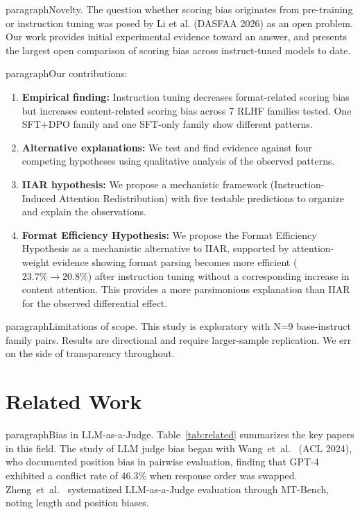 \documentclass[11pt,twocolumn]{article}
\begin{document}
paragraph{Novelty.} The question  whether scoring bias originates from pre-training or instruction tuning  was posed by Li et al. (DASFAA 2026) as an open problem. Our work provides initial experimental evidence toward an answer, and presents the largest open comparison of scoring bias across instruct-tuned models to date.

paragraph{Our contributions:}
\begin{enumerate}
    \item \textbf{Empirical finding:} Instruction tuning decreases format-related scoring bias but increases content-related scoring bias across 7 RLHF families tested. One SFT+DPO family and one SFT-only family show different patterns.
    \item \textbf{Alternative explanations:} We test and find evidence against four competing hypotheses using qualitative analysis of the observed patterns.
    \item \textbf{IIAR hypothesis:} We propose a mechanistic framework (Instruction-Induced Attention Redistribution) with five testable predictions to organize and explain the observations.
    \item \textbf{Format Efficiency Hypothesis:} We propose the Format Efficiency Hypothesis as a mechanistic alternative to IIAR, supported by attention-weight evidence showing format parsing becomes more efficient ($23.7\% \to 20.8\%$) after instruction tuning without a corresponding increase in content attention. This provides a more parsimonious explanation than IIAR for the observed differential effect.
\end{enumerate}

paragraph{Limitations of scope.} This study is exploratory with N=9 base-instruct family pairs. Results are directional and require larger-sample replication. We err on the side of transparency throughout.

\section{Related Work}

paragraph{Bias in LLM-as-a-Judge.}
Table~\ref{tab:related} summarizes the key papers in this field. The study of LLM judge bias began with Wang~et~al.~\cite{wang2023large} (ACL 2024), who documented position bias in pairwise evaluation, finding that GPT-4 exhibited a conflict rate of 46.3\% when response order was swapped. Zheng~et~al.~\cite{zheng2023judging} systematized LLM-as-a-Judge evaluation through MT-Bench, noting length and position biases.
\end{document}
